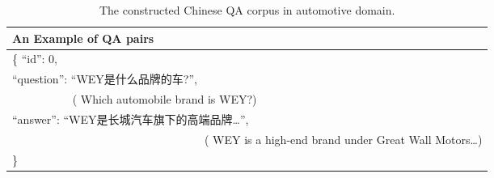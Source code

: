\documentclass[mathematics,article,submit,moreauthors]{Definitions/mdpi}
\newcommand{\1}[1]{\mathds{1}\left[#1\right]}
\begin{document}
\begin{table}[H] 
	\caption{The constructed Chinese QA corpus in automotive domain.} \label{tab:base_corpus}
	\begin{tabularx}{\textwidth}{C}
		\toprule
		\textbf{An Example of QA pairs}	\\
		\midrule
		\{ ``id'': 0,~~~~~~~~~~~~~~~~~~~~~~~~~~~~~~~~~~~~~~~~~~~~~~~~~~~~~~~~~~~~~~~~ \\
		``question'': ``WEY是什么品牌的车?'',~~~~~~~~~~~~~~~~~~~~~~ \\
		~~~~~~~~~~ ({\color{blue} Which automobile brand is WEY?}) \\ 
		``answer'': ``WEY是长城汽车旗下的高端品牌…'', ~~~~~~~\\
		 ~~~~~~~~~~~~~~~~~~~~~~~~~~~~~~~~~~({\color{blue} WEY is a high-end brand under Great Wall Motors…}) \\
		\}~~~~~~~~~~~~~~~~~~~~~~~~~~~~~~~~~~~~~~~~~~~~~~~~~~~~~~~~~~~~~~~~~~~~~~~~~\\
		\bottomrule
	\end{tabularx}
\end{table}
\end{document}
